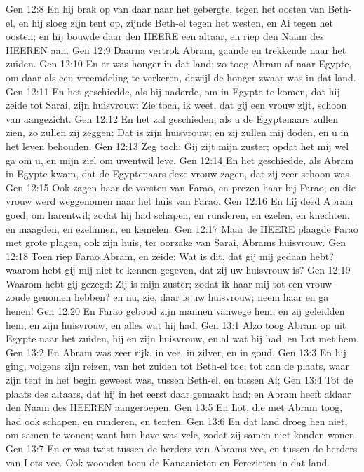 Gen 12:8  En hij brak op van daar naar het gebergte, tegen het oosten van Beth-el, en hij sloeg zijn tent op, zijnde Beth-el tegen het westen, en Ai tegen het oosten; en hij bouwde daar den HEERE een altaar, en riep den Naam des HEEREN aan.
Gen 12:9  Daarna vertrok Abram, gaande en trekkende naar het zuiden.
Gen 12:10  En er was honger in dat land; zo toog Abram af naar Egypte, om daar als een vreemdeling te verkeren, dewijl de honger zwaar was in dat land.
Gen 12:11  En het geschiedde, als hij naderde, om in Egypte te komen, dat hij zeide tot Sarai, zijn huisvrouw: Zie toch, ik weet, dat gij een vrouw zijt, schoon van aangezicht.
Gen 12:12  En het zal geschieden, als u de Egyptenaars zullen zien, zo zullen zij zeggen: Dat is zijn huisvrouw; en zij zullen mij doden, en u in het leven behouden.
Gen 12:13  Zeg toch: Gij zijt mijn zuster; opdat het mij wel ga om u, en mijn ziel om uwentwil leve.
Gen 12:14  En het geschiedde, als Abram in Egypte kwam, dat de Egyptenaars deze vrouw zagen, dat zij zeer schoon was.
Gen 12:15  Ook zagen haar de vorsten van Farao, en prezen haar bij Farao; en die vrouw werd weggenomen naar het huis van Farao.
Gen 12:16  En hij deed Abram goed, om harentwil; zodat hij had schapen, en runderen, en ezelen, en knechten, en maagden, en ezelinnen, en kemelen.
Gen 12:17  Maar de HEERE plaagde Farao met grote plagen, ook zijn huis, ter oorzake van Sarai, Abrams huisvrouw.
Gen 12:18  Toen riep Farao Abram, en zeide: Wat is dit, dat gij mij gedaan hebt? waarom hebt gij mij niet te kennen gegeven, dat zij uw huisvrouw is?
Gen 12:19  Waarom hebt gij gezegd: Zij is mijn zuster; zodat ik haar mij tot een vrouw zoude genomen hebben? en nu, zie, daar is uw huisvrouw; neem haar en ga henen!
Gen 12:20  En Farao gebood zijn mannen vanwege hem, en zij geleidden hem, en zijn huisvrouw, en alles wat hij had.
Gen 13:1  Alzo toog Abram op uit Egypte naar het zuiden, hij en zijn huisvrouw, en al wat hij had, en Lot met hem.
Gen 13:2  En Abram was zeer rijk, in vee, in zilver, en in goud.
Gen 13:3  En hij ging, volgens zijn reizen, van het zuiden tot Beth-el toe, tot aan de plaats, waar zijn tent in het begin geweest was, tussen Beth-el, en tussen Ai;
Gen 13:4  Tot de plaats des altaars, dat hij in het eerst daar gemaakt had; en Abram heeft aldaar den Naam des HEEREN aangeroepen.
Gen 13:5  En Lot, die met Abram toog, had ook schapen, en runderen, en tenten.
Gen 13:6  En dat land droeg hen niet, om samen te wonen; want hun have was vele, zodat zij samen niet konden wonen.
Gen 13:7  En er was twist tussen de herders van Abrams vee, en tussen de herders van Lots vee. Ook woonden toen de Kanaanieten en Ferezieten in dat land.
